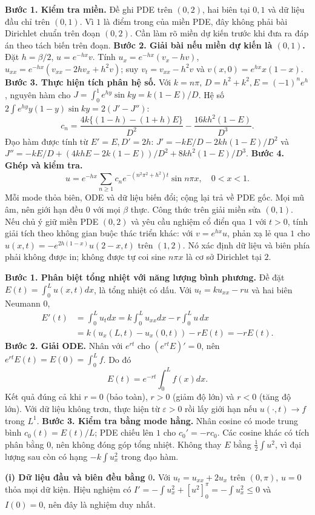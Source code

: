 \textbf{Bước 1. Kiểm tra miền.}
Đề ghi PDE trên $(0,2)$, hai biên tại $0,1$ và dữ liệu đầu chỉ trên $(0,1)$. Vì $1$ là điểm trong của miền PDE, đây không phải bài Dirichlet chuẩn trên đoạn $(0,2)$. Cần làm rõ miền dự kiến trước khi đưa ra đáp án theo tách biến trên đoạn.
\textbf{Bước 2. Giải bài nếu miền dự kiến là $(0,1)$.}
Đặt $h=\beta/2$, $u=e^{-hx}v$. Tính $u_x=e^{-hx}(v_x-hv)$, $u_{xx}=e^{-hx}(v_{xx}-2hv_x+h^2v)$; suy $v_t=v_{xx}-h^2v$ và $v(x,0)=e^{hx}x(1-x)$.
\textbf{Bước 3. Thực hiện tích phân hệ số.}
Với $k=n\pi$, $D=h^2+k^2,E=(-1)^ne^h$, nguyên hàm cho $J=\int_0^1e^{hy}\sin ky=k(1-E)/D$. Hệ số $2\int e^{hy}y(1-y)\sin ky=2(J'-J'')$:
\[c_n=\frac{4k\{(1-h)-(1+h)E\}}{D^2}
-\frac{16kh^2(1-E)}{D^3}.\]
Đạo hàm được tính từ $E'=E,D'=2h$: $J'=-kE/D-2kh(1-E)/D^2$ và $J''=-kE/D+(4khE-2k(1-E))/D^2+8kh^2(1-E)/D^3$.
\textbf{Bước 4. Ghép và kiểm tra.}
\[u=e^{-hx}\sum_{n\ge1}c_ne^{-(n^2\pi^2+h^2)t}\sin n\pi x,\quad0<x<1.\]
Mỗi mode thỏa biên, ODE và dữ liệu biến đổi; cộng lại trả về PDE gốc. Mọi mũ âm, nên giới hạn đều $0$ với mọi $\beta$ thực. Công thức trên giải miền sửa $(0,1)$. Nếu chủ ý giữ miền PDE $(0,2)$ và yêu cầu nghiệm cổ điển qua $1$ với $t>0$, tính giải tích theo không gian buộc thác triển khác: với $v=e^{hx}u$, phản xạ lẻ qua $1$ cho $u(x,t)=-e^{2h(1-x)}u(2-x,t)$ trên $(1,2)$. Nó xác định dữ liệu và biên phía phải không được in; không được tự coi sine $n\pi x$ là cơ sở Dirichlet tại $2$.

\textbf{Bước 1. Phân biệt tổng nhiệt với năng lượng bình phương.}
Đề đặt $E(t)=\int_0^Lu(x,t)dx$, là tổng nhiệt có dấu. Với $u_t=ku_{xx}-ru$ và hai biên Neumann $0$,
\begin{align*}
E'(t)&=\int_0^Lu_tdx=k\int_0^Lu_{xx}dx-r\int_0^Lu\,dx\\
&=k(u_x(L,t)-u_x(0,t))-rE(t)=-rE(t).
\end{align*}
\textbf{Bước 2. Giải ODE.}
Nhân với $e^{rt}$ cho $(e^{rt}E)'=0$, nên $e^{rt}E(t)=E(0)=\int_0^Lf$. Do đó
\[E(t)=e^{-rt}\int_0^Lf(x)dx.\]
Kết quả đúng cả khi $r=0$ (bảo toàn), $r>0$ (giảm độ lớn) và $r<0$ (tăng độ lớn). Với dữ liệu không trơn, thực hiện từ $\varepsilon>0$ rồi lấy giới hạn nếu $u(\cdot,t)\to f$ trong $L^1$.
\textbf{Bước 3. Kiểm tra bằng mode hằng.}
Nhân cosine có mode trung bình $c_0(t)=E(t)/L$; PDE chiếu lên $1$ cho $c_0'=-rc_0$. Các cosine khác có tích phân bằng $0$, nên không đóng góp tổng nhiệt. Không thay $E$ bằng $\frac12\int u^2$, vì đại lượng sau còn có hạng $-k\int u_x^2$ trong đạo hàm.

\textbf{(i) Dữ liệu đầu và biên đều bằng $0$.}
Với $u_t=u_{xx}+2u_x$ trên $(0,\pi)$, $u=0$ thỏa mọi dữ kiện. Hiệu nghiệm có $I'=-\int u_x^2+[u^2]_0^\pi=-\int u_x^2\le0$ và $I(0)=0$, nên đây là nghiệm duy nhất.

